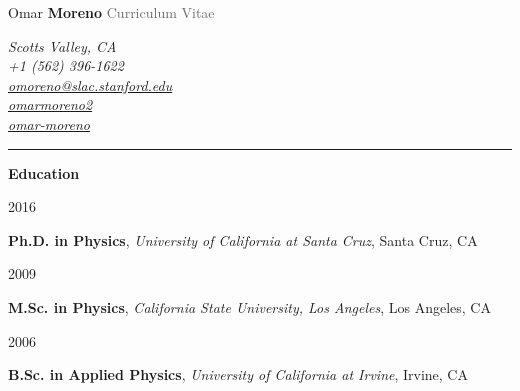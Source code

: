 \documentclass[11pt]{article}
\newcommand{\cvsection}[1] {
    \noindent
    \textcolor{indigodye}{\rule{.15\textwidth}{.1in} \hspace{0.01 \textwidth} \textbf{\Large{#1}}} \newline 
}
\newcommand{\educationentry}[5] { 
    \noindent
    \begin{minipage}[t]{0.15\textwidth} \begin{flushright} #1 \end{flushright} \end{minipage} \hspace{0.01\textwidth}
    \begin{minipage}[t]{0.84\textwidth} 
        \textbf{#2}, \emph{#3}, #4 
    \end{minipage}
}
\begin{document}
    
    \noindent
    \begin{minipage}[c]{0.5\textwidth}
        \begin{flushleft}
            \Huge{Omar \textcolor{indigodye}{\textbf{Moreno}}} \newline
            \Large{\textcolor{dimgray}{Curriculum Vitae}}
        \end{flushleft}
    \end{minipage}
    \begin{minipage}[c]{0.50\textwidth}
        \begin{flushright}
            \color{dimgray} \em
            Scotts Valley, CA           \\
            \faMobilePhone \hspace{1pt} +1 (562) 396-1622       \\
            \faEnvelope \hspace{1pt} \href{mailto:omoreno@slac.stanford.edu}{omoreno@slac.stanford.edu}          \\
            \faLinkedin \hspace{1pt} \href{https://www.linkedin.com/in/omarmoreno2}{omarmoreno2} \\
            \faGithub \hspace{1pt} \href{https://github.com/omar-moreno}{omar-moreno}            \\
        \end{flushright}
    \end{minipage}

    \cvsection{Education}
        \educationentry{2016}
                       {Ph.D. in Physics}
                       {University of California at Santa Cruz}
                       {Santa Cruz, CA}
                       {Dissertation: Search for a Heavy Photon in the 2015 Engineering Run Data of the Heavy Photon Search Experiment}
        \educationentry{2009}
                       {M.Sc. in Physics}
                       {California State University, Los Angeles}
                       {Los Angeles, CA}
                       {Thesis: Measurement of the Analyzing Power for the Reactions $p + CH_{2} \rightarrow X$ at a Proton Momentum of 2.2032 GeV/c}
        \educationentry{2006}
                       {B.Sc. in Applied Physics}
                       {University of California at Irvine}
                       {Irvine, CA}
                       {Thesis: Search for the $B\rightarrow e^+e^-$ as a Hint to Supersymmetry}
\end{document}
